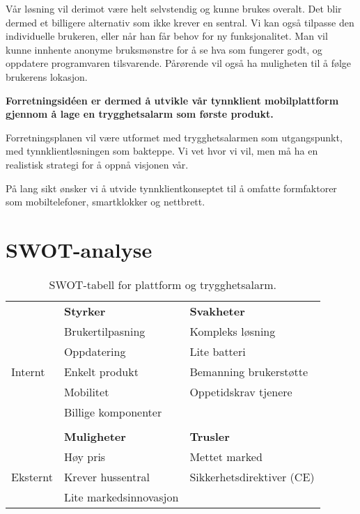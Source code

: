 Vår løsning vil derimot være helt selvstendig og kunne brukes overalt. Det blir
dermed et billigere alternativ som ikke krever en sentral. Vi kan også tilpasse
den individuelle brukeren, eller når han får behov for ny funksjonalitet. Man
vil kunne innhente anonyme bruksmønstre for å se hva som fungerer godt, og
oppdatere programvaren tilsvarende. Pårørende vil også ha muligheten til å
følge brukerens lokasjon.

\textbf{Forretningsidéen er dermed å utvikle vår tynnklient mobilplattform
gjennom å lage en trygghetsalarm som første produkt.}

Forretningsplanen vil være utformet med trygghetsalarmen som utgangspunkt, med
tynnklientløsningen som bakteppe. Vi vet hvor vi vil, men må ha en realistisk
strategi for å oppnå visjonen vår.

På lang sikt ønsker vi å utvide tynnklientkonseptet til å omfatte formfaktorer
som mobiltelefoner, smartklokker og nettbrett.

\section{SWOT-analyse}

\begin{table}[h]
  \centering
  \begin{tabular}{lll}
             & \textbf{Styrker}       & \textbf{Svakheter}        \\
             & Brukertilpasning       & Kompleks løsning          \\
             & Oppdatering            & Lite batteri              \\
    Internt  & Enkelt produkt         & Bemanning brukerstøtte    \\
             & Mobilitet              & Oppetidskrav tjenere      \\
             & Billige komponenter    &                           \\
    \\
             & \textbf{Muligheter}    & \textbf{Trusler}          \\
             & Høy pris               & Mettet marked             \\
    Eksternt & Krever hussentral      & Sikkerhetsdirektiver (CE) \\
             & Lite markedsinnovasjon &                           \\
  \end{tabular}
  \caption{SWOT-tabell for plattform og trygghetsalarm.}
  \label{table.swot}
\end{table}

